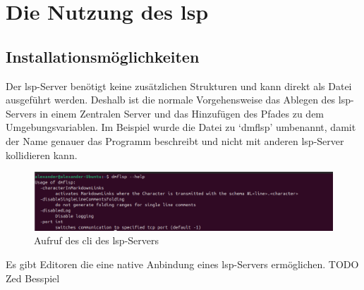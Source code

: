 \documentclass[./einleitung.tex]{subfiles}
\begin{document}
    \section{Die Nutzung des \acrshort{lsp}}
    \subsection{Installationsmöglichkeiten}
    Der \acrshort{lsp}-Server benötigt keine zusätzlichen Strukturen und kann direkt als Datei ausgeführt werden.
    Deshalb ist die normale Vorgehensweise das Ablegen des \acrshort{lsp}-Servers in einem Zentralen Server und das Hinzufügen des Pfades zu dem Umgebungsvariablen.
    Im Beispiel wurde die Datei zu `dmflsp' umbenannt, damit der Name genauer das Programm beschreibt und nicht mit anderen \acrshort{lsp}-Server kollidieren kann.
    \begin{figure}
        \centering
        \includegraphics[width=\linewidth]{bilder/screenshot-lsp-help}
        \caption{Aufruf des \acrshort{cli} des \acrshort{lsp}-Servers}
        \label{fig:screenshot-lsp-help}
    \end{figure}
    Es gibt Editoren die eine native Anbindung eines \acrshort{lsp}-Servers ermöglichen.
        {\footnotesize TODO Zed Besspiel }
\end{document}
